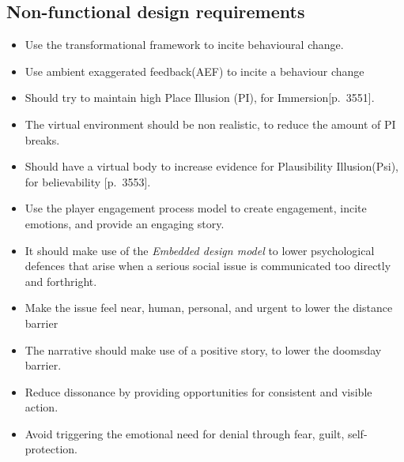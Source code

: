 \subsection{Non-functional design requirements}
\begin{itemize}
    \item Use the transformational framework to incite behavioural change.\cite{transformationalFramework}
    \item Use ambient exaggerated feedback(AEF) to incite a behaviour change \cite{waterConsumption}
    
    \item Should try to maintain high Place Illusion (PI), for Immersion\citep{vrImmersion}[p.~3551].
    \item The virtual environment should be non realistic, to reduce the amount of PI breaks.
    \item Should have a virtual body to increase evidence for Plausibility Illusion(Psi), for believability \citep{vrImmersion}[p.~3553].

    \item Use the player engagement process model to create engagement, incite emotions, and provide an engaging story\cite{playerEngagement}.
    
    \item It should make use of the \textit{Embedded design model} to lower psychological defences that arise when a serious social issue is communicated too directly and forthright\cite{embeddedDesignModel}.
    
    \item Make the issue feel near, human, personal, and urgent to lower the distance barrier %
    \item The narrative should make use of a positive story, to lower the doomsday barrier. %
    \item Reduce dissonance by providing opportunities for consistent and visible action. %
    \item Avoid triggering the emotional need for denial through fear, guilt, self-protection\cite{the5Ds}. %
    
\end{itemize}